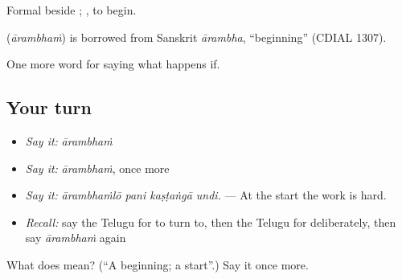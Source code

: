 Formal beside ; , to begin.

\begin{cousinweb}
\textbf{} (\emph{ārambhaṁ}) is borrowed from Sanskrit \emph{ārambha}, \textquotedblleft{}beginning\textquotedblright{} (CDIAL 1307).
\end{cousinweb}

\begin{grammarlens}[title={What you've built}]
One more word for saying what happens if.
\end{grammarlens}

\subsection*{Your turn}
\begin{itemize}
\raggedright
  \item \emph{Say it:} \emph{ārambhaṁ}
  \item \emph{Say it:} \emph{ārambhaṁ}, once more
  \item \emph{Say it:} \emph{ārambhaṁlō pani kaṣṭaṅgā undi.} — At the start the work is hard.
  \item \emph{Recall:} say the Telugu for to turn to, then the Telugu for deliberately, then say \emph{ārambhaṁ} again
\end{itemize}

\begin{tcolorbox}[breakable,colback=teal!4,colframe=teal!35!black,title={Before you move on}]
What does  mean? (\textquotedblleft{}A beginning; a start\textquotedblright{}.) Say it once more.
\end{tcolorbox}
